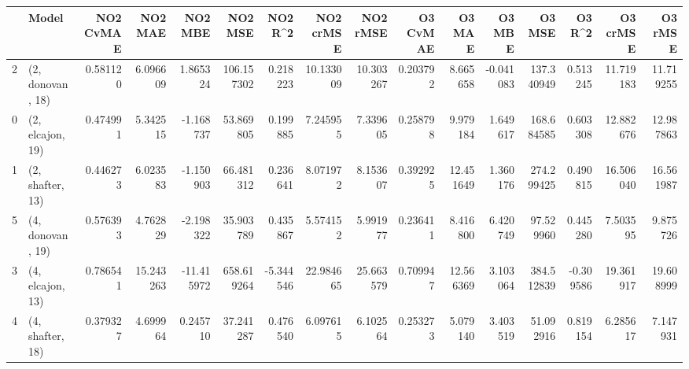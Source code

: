\begin{tabular}{llrrrrrrrrrrrrrr}
\toprule
{} &             Model &  NO2 CvMAE &    NO2 MAE &    NO2 MBE &     NO2 MSE &   NO2 R\textasciicircum2 &  NO2 crMSE &   NO2 rMSE &  O3 CvMAE &     O3 MAE &    O3 MBE &      O3 MSE &    O3 R\textasciicircum2 &   O3 crMSE &    O3 rMSE \\
\midrule
2 &  (2, donovan, 18) &   0.581120 &   6.096609 &   1.865324 &  106.157302 &  0.218223 &  10.133009 &  10.303267 &  0.203792 &   8.665658 & -0.041083 &  137.340949 &  0.513245 &  11.719183 &  11.719255 \\
0 &  (2, elcajon, 19) &   0.474991 &   5.342515 &  -1.168737 &   53.869805 &  0.199885 &   7.245955 &   7.339605 &  0.258798 &   9.979184 &  1.649617 &  168.684585 &  0.603308 &  12.882676 &  12.987863 \\
1 &  (2, shafter, 13) &   0.446273 &   6.023583 &  -1.150903 &   66.481312 &  0.236641 &   8.071972 &   8.153607 &  0.392925 &  12.451649 &  1.360176 &  274.299425 &  0.490815 &  16.506040 &  16.561987 \\
5 &  (4, donovan, 19) &   0.576393 &   4.762829 &  -2.198322 &   35.903789 &  0.435867 &   5.574152 &   5.991977 &  0.236411 &   8.416800 &  6.420749 &   97.529960 &  0.445280 &   7.503595 &   9.875726 \\
3 &  (4, elcajon, 13) &   0.786541 &  15.243263 & -11.415972 &  658.619264 & -5.344546 &  22.984665 &  25.663579 &  0.709947 &  12.566369 &  3.103064 &  384.512839 & -0.309586 &  19.361917 &  19.608999 \\
4 &  (4, shafter, 18) &   0.379327 &   4.699964 &   0.245710 &   37.241287 &  0.476540 &   6.097615 &   6.102564 &  0.253273 &   5.079140 &  3.403519 &   51.092916 &  0.819154 &   6.285617 &   7.147931 \\
\bottomrule
\end{tabular}
